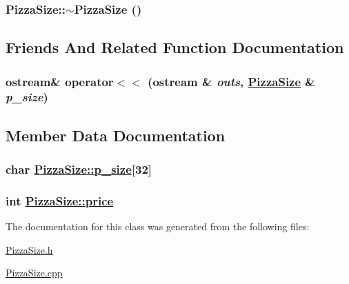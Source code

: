 \hypertarget{class_pizza_size_1e38361f1aaa91379e38ba18d5c7d579}{
\subsubsection[$\sim$PizzaSize]{\setlength{\rightskip}{0pt plus 5cm}Pizza\-Size::$\sim$Pizza\-Size ()}}
\label{class_pizza_size_1e38361f1aaa91379e38ba18d5c7d579}




\subsection{Friends And Related Function Documentation}
\hypertarget{class_pizza_size_aeefabdbf1b3e9ffbc20170fcdee8bec}{
\subsubsection[operator$<$$<$]{\setlength{\rightskip}{0pt plus 5cm}ostream\& operator$<$$<$ (ostream \& {\em outs}, \hyperlink{class_pizza_size}{Pizza\-Size} \& {\em p\_\-size})}}
\label{class_pizza_size_aeefabdbf1b3e9ffbc20170fcdee8bec}




\subsection{Member Data Documentation}
\hypertarget{class_pizza_size_42c17e691e40072f9ef449e812c5ecc3}{
\subsubsection[p\_\-size]{\setlength{\rightskip}{0pt plus 5cm}char \hyperlink{class_pizza_size_42c17e691e40072f9ef449e812c5ecc3}{Pizza\-Size::p\_\-size}\mbox{[}32\mbox{]}}}
\label{class_pizza_size_42c17e691e40072f9ef449e812c5ecc3}


\hypertarget{class_pizza_size_78a5eb43deef9a7b5b9ce157b9d52ac4}{
\subsubsection[price]{\setlength{\rightskip}{0pt plus 5cm}int \hyperlink{class_pizza_size_78a5eb43deef9a7b5b9ce157b9d52ac4}{Pizza\-Size::price}}}
\label{class_pizza_size_78a5eb43deef9a7b5b9ce157b9d52ac4}




The documentation for this class was generated from the following files:\begin{CompactItemize}
\item 
\hyperlink{_pizza_size_8h}{Pizza\-Size.h}\item 
\hyperlink{_pizza_size_8cpp}{Pizza\-Size.cpp}\end{CompactItemize}
